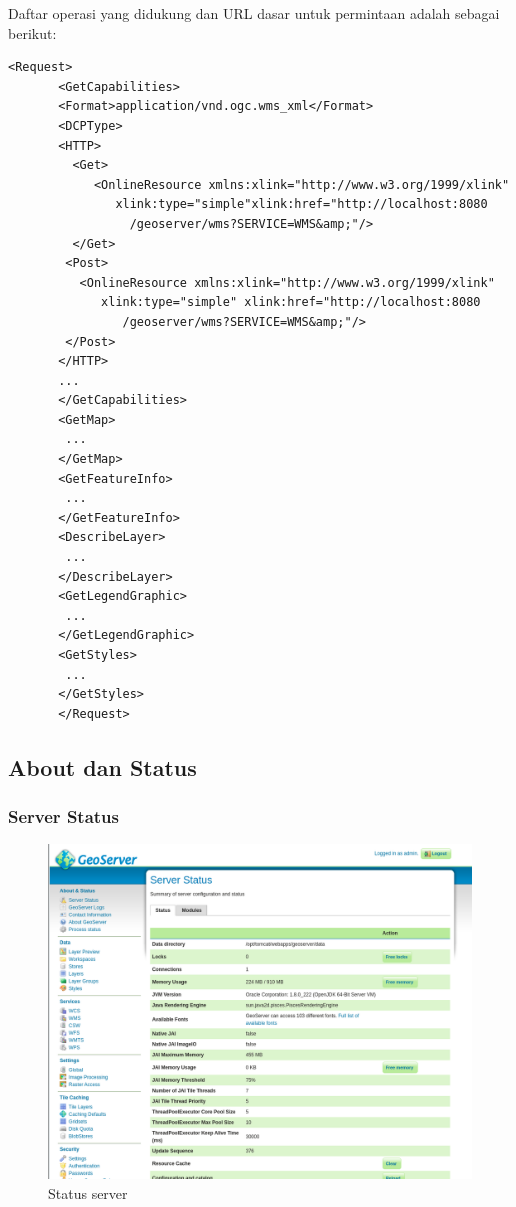 \documentclass[]{book}
\begin{document}
Daftar operasi yang didukung dan URL dasar untuk permintaan adalah sebagai berikut:

\begin{verbatim}
<Request> 
       <GetCapabilities> 
       <Format>application/vnd.ogc.wms_xml</Format> 
       <DCPType> 
       <HTTP> 
         <Get> 
            <OnlineResource xmlns:xlink="http://www.w3.org/1999/xlink"
               xlink:type="simple"xlink:href="http://localhost:8080
                 /geoserver/wms?SERVICE=WMS&amp;"/> 
         </Get> 
        <Post> 
          <OnlineResource xmlns:xlink="http://www.w3.org/1999/xlink"   
             xlink:type="simple" xlink:href="http://localhost:8080
                /geoserver/wms?SERVICE=WMS&amp;"/> 
        </Post> 
       </HTTP> 
       ... 
       </GetCapabilities> 
       <GetMap> 
        ... 
       </GetMap> 
       <GetFeatureInfo> 
        ... 
       </GetFeatureInfo> 
       <DescribeLayer> 
        ... 
       </DescribeLayer> 
       <GetLegendGraphic> 
        ... 
       </GetLegendGraphic> 
       <GetStyles> 
        ... 
       </GetStyles> 
       </Request> 
\end{verbatim}

\hypertarget{about-dan-status}{%
\subsection{About dan Status}\label{about-dan-status}}

\hypertarget{server-status}{%
\subsubsection{Server Status}\label{server-status}}

\begin{figure}

{\centering \includegraphics[width=0.6\linewidth]{images/08/gs4} 

}

\caption{Status server}\label{fig:gs4}
\end{figure}
\end{document}
